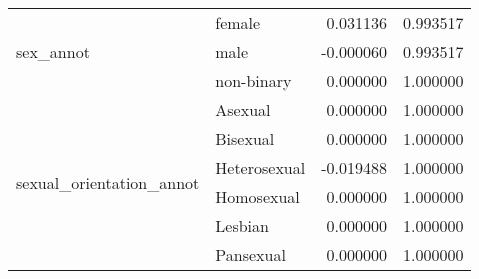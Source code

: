 \begin{longtable}{llrr}
\cline{1-4}
\multirow[t]{3}{*}{sex\_annot} & female & 0.031136 & 0.993517 \\
 & male & -0.000060 & 0.993517 \\
 & non-binary & 0.000000 & 1.000000 \\
\cline{1-4}
\multirow[t]{6}{*}{sexual\_orientation\_annot} & Asexual & 0.000000 & 1.000000 \\
 & Bisexual & 0.000000 & 1.000000 \\
 & Heterosexual & -0.019488 & 1.000000 \\
 & Homosexual & 0.000000 & 1.000000 \\
 & Lesbian & 0.000000 & 1.000000 \\
 & Pansexual & 0.000000 & 1.000000 \\
\cline{1-4}
\end{longtable}
